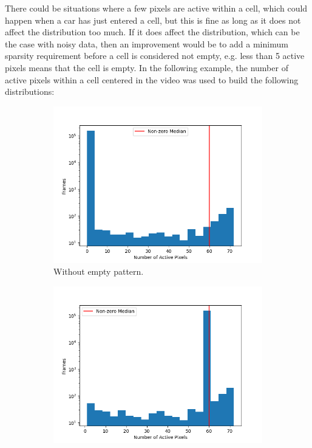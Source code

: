 There could be situations where a few pixels are active within a cell, which could happen when a car has just entered a cell, but this is fine as long as it does not affect the distribution too much. If it does affect the distribution, which can be the case with noisy data, then an improvement would be to add a minimum sparsity requirement before a cell is considered not empty, e.g. less than 5 active pixels means that the cell is empty.  In the following example, the number of active pixels within a cell centered in the video was used to build the following distributions:
\begin{figure}[H]
    \centering
    \begin{subfigure}[t]{0.5\textwidth}
        \centering
        \includegraphics[width=\textwidth]{resources/methodology/active_pixels_dist.png}
        \caption{Without empty pattern.}
        \label{fig:num_active_pixels_cell}
    \end{subfigure}%
    \begin{subfigure}[t]{0.5\textwidth}
        \centering
        \includegraphics[width=\textwidth]{resources/methodology/active_pixels_dist2.png}

\end{subfigure}
\end{figure}
